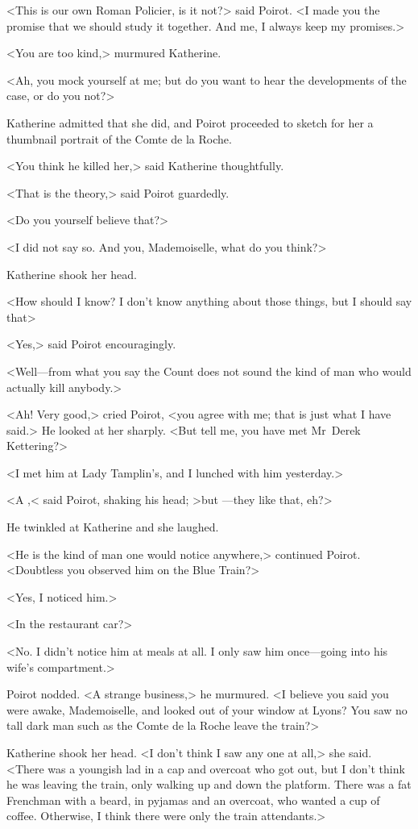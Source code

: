 <This is our own Roman Policier, is it not?> said Poirot. <I made you the promise that we should study it together. And me, I always keep my promises.>

<You are too kind,> murmured Katherine.

<Ah, you mock yourself at me; but do you want to hear the developments of the case, or do you not?>

Katherine admitted that she did, and Poirot proceeded to sketch for her a thumbnail portrait of the Comte de la Roche.

<You think he killed her,> said Katherine thoughtfully.

<That is the theory,> said Poirot guardedly.

<Do you yourself believe that?>

<I did not say so. And you, Mademoiselle, what do you think?>

Katherine shook her head.

<How should I know? I don't know anything about those things, but I should say that\longdash>

<Yes,> said Poirot encouragingly.

<Well—from what you say the Count does not sound the kind of man who would actually kill anybody.>

<Ah! Very good,> cried Poirot, <you agree with me; that is just what I have said.> He looked at her sharply. <But tell me, you have met Mr~Derek Kettering?>

<I met him at Lady Tamplin's, and I lunched with him yesterday.>

<A ,< said Poirot, shaking his head; >but —they like that, eh?>

He twinkled at Katherine and she laughed.

<He is the kind of man one would notice anywhere,> continued Poirot. <Doubtless you observed him on the Blue Train?>

<Yes, I noticed him.>

<In the restaurant car?>

<No. I didn't notice him at meals at all. I only saw him once—going into his wife's compartment.>

Poirot nodded. <A strange business,> he murmured. <I believe you said you were awake, Mademoiselle, and looked out of your window at Lyons? You saw no tall dark man such as the Comte de la Roche leave the train?>

Katherine shook her head. <I don't think I saw any one at all,> she said. <There was a youngish lad in a cap and overcoat who got out, but I don't think he was leaving the train, only walking up and down the platform. There was a fat Frenchman with a beard, in pyjamas and an overcoat, who wanted a cup of coffee. Otherwise, I think there were only the train attendants.>

